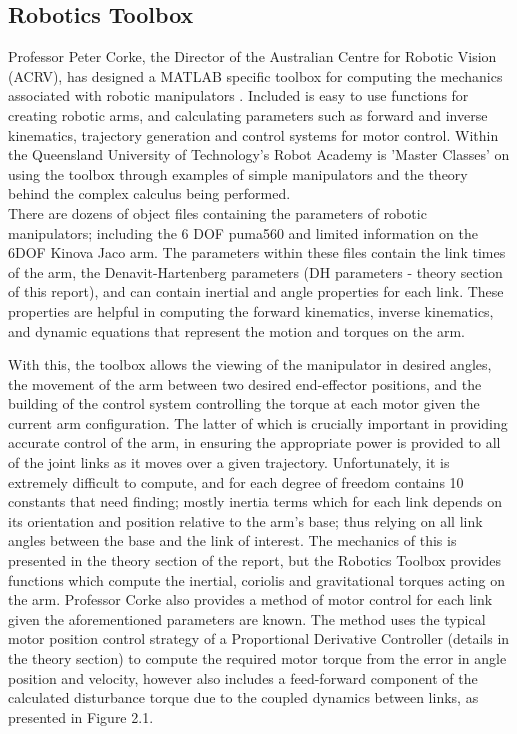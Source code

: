 \documentclass[12pt,openany,a4paper]{book}
\begin{document}
\subsection{Robotics Toolbox}
Professor Peter Corke, the Director of the Australian Centre for Robotic Vision (ACRV), has designed a MATLAB specific toolbox for computing the mechanics associated with robotic manipulators \cite{robotacademy1}. Included is easy to use functions for creating robotic arms, and calculating parameters such as forward and inverse kinematics, trajectory generation and control systems for motor control. Within the Queensland University of Technology's Robot Academy is 'Master Classes' on using the toolbox through examples of simple manipulators and the theory behind the complex calculus being performed.\\

There are dozens of object files containing the parameters of robotic manipulators; including the 6 DOF puma560 and limited information on the 6DOF Kinova Jaco arm. The parameters within these files contain the link times of the arm, the Denavit-Hartenberg parameters (DH parameters - theory section of this report), and can contain inertial and angle properties for each link. These properties are helpful in computing the forward kinematics, inverse kinematics, and dynamic equations that represent the motion and torques on the arm.

With this, the toolbox allows the viewing of the manipulator in desired angles, the movement of the arm between two desired end-effector positions, and the building of the control system controlling the torque at each motor given the current arm configuration. The latter of which is crucially important in providing accurate control of the arm, in ensuring the appropriate power is provided to all of the joint links as it moves over a given trajectory. Unfortunately, it is extremely difficult to compute, and for each degree of freedom contains 10 constants that need finding; mostly inertia terms which for each link depends on its orientation and position relative to the arm's base; thus relying on all link angles between the base and the link of interest. The mechanics of this is presented in the theory section of the report, but the Robotics Toolbox provides functions which compute the inertial, coriolis and gravitational torques acting on the arm. Professor Corke also provides a method of motor control for each link given the aforementioned parameters are known. The method uses the typical motor position control strategy of a Proportional Derivative Controller (details in the theory section) to compute the required motor torque from the error in angle position and velocity, however also includes a feed-forward component of the calculated disturbance torque due to the coupled dynamics between links, as presented in Figure 2.1. 
\end{document}
